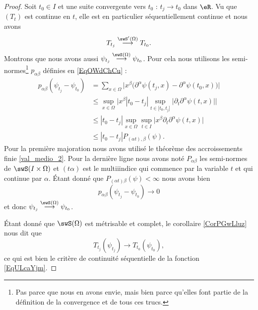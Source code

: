 \begin{proof}
    Soit \( t_0\in I\) et une suite convergente vers \( t_0\) : \( t_j\to t_0\) dans \( \eR\). Vu que \( (T_t)\) est continue en \( t\), elle est en particulier séquentiellement continue et nous avons
    \begin{equation}
        T_{t_j}\stackrel{\swS'(\Omega)}{\longrightarrow}T_{t_0}.
    \end{equation}
    Montrons que nous avons aussi \( \psi_{t_j}\stackrel{\swS(\Omega)}{\longrightarrow}\psi_{t_0}\). Pour cela nous utilisons les semi-normes\footnote{Pas parce que nous en avons envie, mais bien parce qu'elles font partie de la définition de la convergence et de tous ces trucs.} \( p_{\alpha\beta}\) définies en \eqref{EqOWdChCu} :
    \begin{subequations}
        \begin{align}
            p_{\alpha\beta}(\psi_{t_j}-\psi_{t_0})&=\sum_{x\in \Omega}\Big| x^{\beta}\big( \partial^{\alpha}\psi(t_j,x)-\partial^{\alpha}\psi(t_0,x) \big)       \Big|\\
            &\leq\sup_{x\in\Omega}\Big|  x^{\beta}| t_0-t_j |\sup_{t\in \mathopen[ t_0 , t_j \mathclose]}\big| \partial_t\partial^{\alpha}\psi(t,x) \big|   \Big|\\
            &\leq| t_0-t_j |\sup_{x\in\Omega}\sup_{t\in I}\big| x^{\beta}\partial_t\partial^{\alpha}\psi(t,x) \big|\\
            &\leq| t_0-t_j |P_{(\alpha t),\beta}(\psi).
        \end{align}
    \end{subequations}
    Pour la première majoration nous avons utilisé le théorème des accroissements finie \ref{val_medio_2}. Pour la dernière ligne nous avons noté \( P_{\alpha\beta}\) les semi-normes de \( \swS(I\times \Omega)\) et \( (t\alpha)\) est le multiiindice qui commence par la variable \( t\) et qui continue par \( \alpha\). Étant donné que \( P_{(\alpha t)\beta}(\psi)<\infty\) nous avons bien
    \begin{equation}
        p_{\alpha\beta}(\psi_{t_j}-\psi_{t_0})\to 0
    \end{equation}
    et donc \( \psi_{t_j}\stackrel{\swS(\Omega)}{\longrightarrow}\psi_{t_0}\).

    Étant donné que \( \swS(\Omega)\) est métrisable et complet, le corollaire \ref{CorPGwLluz} nous dit que 
    \begin{equation}
        T_{t_j}(\psi_{t_j})\to T_{t_0}(\psi_{t_0}),
    \end{equation}
    ce qui est bien le critère de continuité séquentielle de la fonction \eqref{EqULcaYjm}.
\end{proof}

